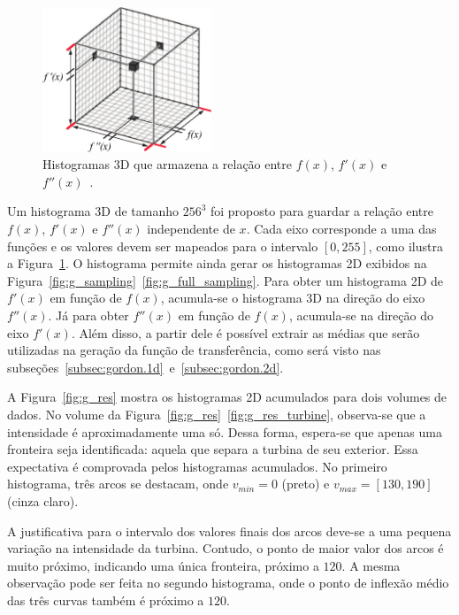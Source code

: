\begin{figure}[b]
	\centering
	\includegraphics[width=0.45\textwidth]{images/g_histo3d}
	\caption{Histogramas 3D que armazena a relação entre $ f(x) $, $ f'(x) $ e $ f''(x) $~\cite{gordonms}.}
	\label{fig:g_histo3d}
\end{figure}
	
	Um histograma 3D de tamanho $ 256^{3} $ foi proposto para guardar a relação entre $ f(x) $, $ f'(x) $ e $ f''(x) $ independente de $x$. Cada eixo corresponde a uma das funções e os valores devem ser mapeados para o intervalo $ [0,255] $, como ilustra a Figura~\ref{fig:g_histo3d}. O histograma permite ainda gerar os histogramas 2D exibidos na Figura~\ref{fig:g_sampling}~\ref{fig:g_full_sampling}. Para obter um histograma 2D de $ f'(x) $ em função de $ f(x) $, acumula-se o histograma 3D na direção do eixo $ f''(x) $. Já para obter $ f''(x) $ em função de $ f(x) $, acumula-se na direção do eixo $ f'(x) $. Além disso, a partir dele é possível extrair as médias que serão utilizadas na geração da função de transferência, como será visto nas subseções~\ref{subsec:gordon.1d}~e~\ref{subsec:gordon.2d}.
	
	A Figura~\ref{fig:g_res} mostra os histogramas 2D acumulados para dois volumes de dados. No volume  da Figura~\ref{fig:g_res}~\ref{fig:g_res_turbine}, observa-se que a intensidade é aproximadamente uma só. Dessa forma, espera-se que apenas uma fronteira seja identificada: aquela que separa a turbina de seu exterior. Essa expectativa é comprovada pelos histogramas acumulados. No primeiro histograma, três arcos se destacam, onde $ v_{min} = 0 $ (preto) e $ v_{max} = [130,190] $ (cinza claro).
	
	A justificativa para o intervalo dos valores finais dos arcos deve-se a uma pequena variação na intensidade da turbina. Contudo, o ponto de maior valor dos arcos é muito próximo, indicando uma única fronteira, próximo a $ 120 $. A mesma observação pode ser feita no segundo histograma, onde o ponto de inflexão médio das três curvas também é próximo a $ 120 $.
	
